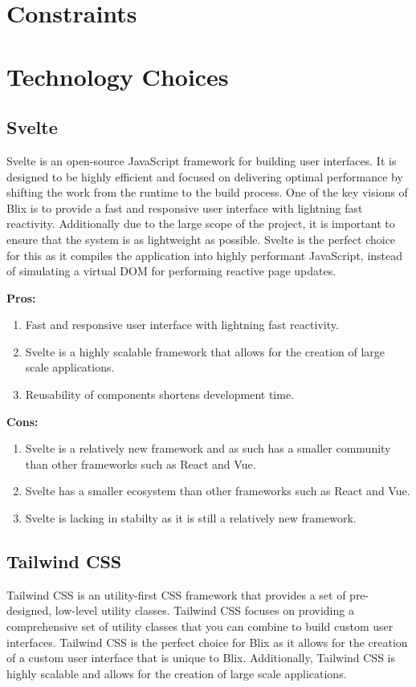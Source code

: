 \documentclass[11pt,a4paper]{article}
\begin{document}
\section{Constraints}


\section{Technology Choices}

\subsection{Svelte}
Svelte is an open-source JavaScript framework for building user interfaces. It
is designed to be highly efficient and focused on delivering optimal performance
by shifting the work from the runtime to the build process. One of the key
visions of Blix is to provide a fast and responsive user interface with
lightning fast reactivity. Additionally due to the large scope of the project,
it is important to ensure that the system is as lightweight as possible. Svelte
is the perfect choice for this as it compiles the application into highly performant JavaScript, instead of simulating a virtual DOM for performing reactive page updates.

\textbf{Pros:}
\begin{enumerate}[label*=\arabic*.]
	\item[\textbullet] Fast and responsive user interface with lightning fast reactivity. 
	\item[\textbullet] Svelte is a highly scalable framework that allows for the creation of large scale applications.
	\item[\textbullet] Reusability of components shortens development time.
\end{enumerate}


\textbf{Cons:}
\begin{enumerate}[label*=\arabic*.]
	\item[\textbullet] Svelte is a relatively new framework and as such has a smaller community than other frameworks such as React and Vue.
	\item[\textbullet] Svelte has a smaller ecosystem than other frameworks such as React and Vue.
	\item[\textbullet] Svelte is lacking in stabilty as it is still a relatively new framework.
\end{enumerate}

\subsection{Tailwind CSS}
Tailwind CSS is an utility-first CSS framework that provides a set of pre-designed, low-level utility classes. Tailwind CSS focuses on providing a comprehensive set of utility classes that you can combine to build custom user interfaces.
Tailwind CSS is the perfect choice for Blix as it allows for the creation of a custom user interface that is unique to Blix. 
Additionally, Tailwind CSS is highly scalable and allows for the creation of large scale applications.
\end{document}
